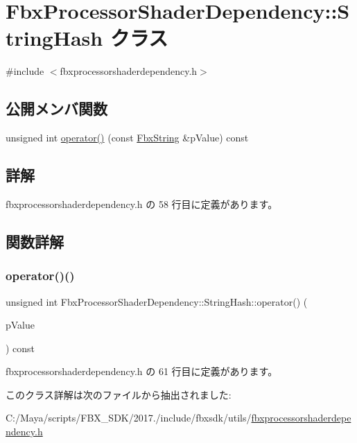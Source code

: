 \hypertarget{class_fbx_processor_shader_dependency_1_1_string_hash}{}\section{Fbx\+Processor\+Shader\+Dependency\+:\+:String\+Hash クラス}
\label{class_fbx_processor_shader_dependency_1_1_string_hash}


{\ttfamily \#include $<$fbxprocessorshaderdependency.\+h$>$}

\subsection*{公開メンバ関数}
\begin{DoxyCompactItemize}
\item 
unsigned int \hyperlink{class_fbx_processor_shader_dependency_1_1_string_hash_a76ebff83fb3666e678a1ef8d181bea56}{operator()} (const \hyperlink{class_fbx_string}{Fbx\+String} \&p\+Value) const
\end{DoxyCompactItemize}


\subsection{詳解}


 fbxprocessorshaderdependency.\+h の 58 行目に定義があります。



\subsection{関数詳解}
\mbox{\label{class_fbx_processor_shader_dependency_1_1_string_hash_a76ebff83fb3666e678a1ef8d181bea56}} 
\subsubsection{\texorpdfstring{operator()()}{operator()()}}
{\footnotesize\ttfamily unsigned int Fbx\+Processor\+Shader\+Dependency\+::\+String\+Hash\+::operator() (\begin{DoxyParamCaption}\item[{const \hyperlink{class_fbx_string}{Fbx\+String} \&}]{p\+Value }\end{DoxyParamCaption}) const\hspace{0.3cm}{\ttfamily [inline]}}



 fbxprocessorshaderdependency.\+h の 61 行目に定義があります。



このクラス詳解は次のファイルから抽出されました\+:\begin{DoxyCompactItemize}
\item 
C\+:/\+Maya/scripts/\+F\+B\+X\+\_\+\+S\+D\+K/2017./include/fbxsdk/utils/\hyperlink{fbxprocessorshaderdependency_8h}{fbxprocessorshaderdependency.\+h}\end{DoxyCompactItemize}
